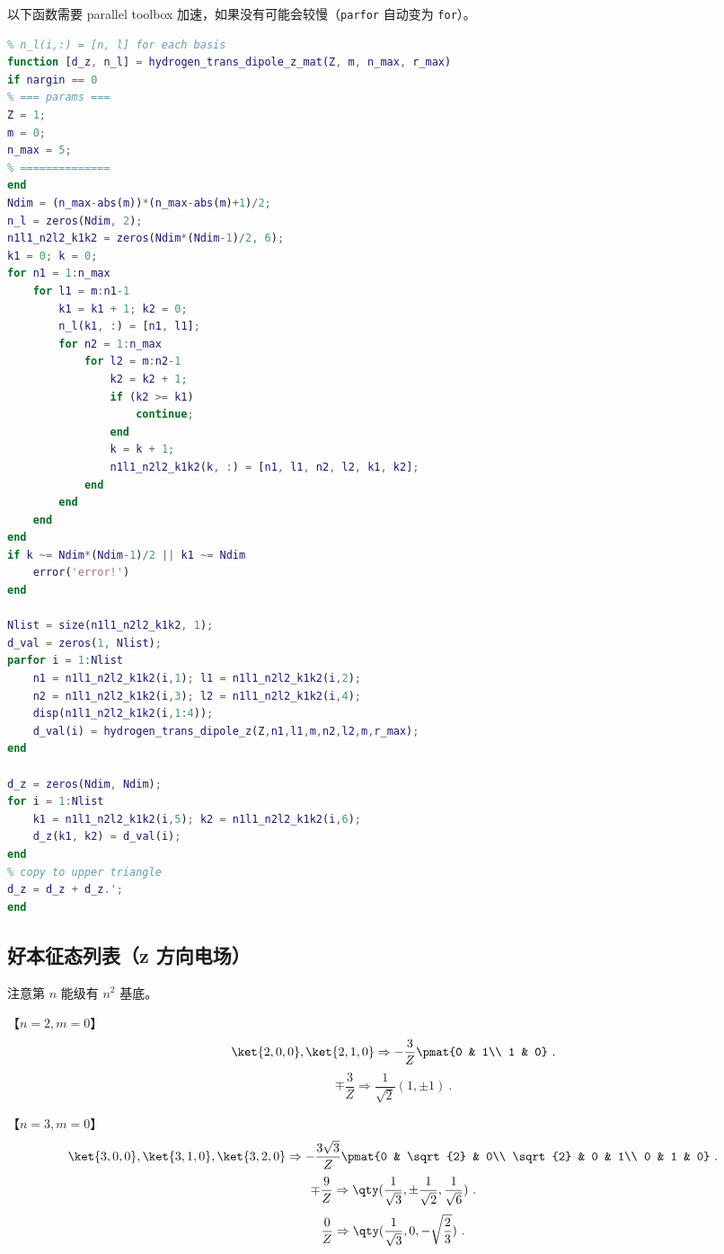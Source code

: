 以下函数需要 parallel toolbox 加速，如果没有可能会较慢（\verb`parfor` 自动变为 \verb`for`）。
\begin{lstlisting}[language=matlab,caption=hydrogen\_dipole\_z\_mat.m]
% hydrogen <n1,l1,m1|z|n2,l2,m2> matrix
% n_l(i,:) = [n, l] for each basis
function [d_z, n_l] = hydrogen_trans_dipole_z_mat(Z, m, n_max, r_max)
if nargin == 0
% === params ===
Z = 1;
m = 0;
n_max = 5;
% ==============
end
Ndim = (n_max-abs(m))*(n_max-abs(m)+1)/2;
n_l = zeros(Ndim, 2);
n1l1_n2l2_k1k2 = zeros(Ndim*(Ndim-1)/2, 6);
k1 = 0; k = 0;
for n1 = 1:n_max
    for l1 = m:n1-1
        k1 = k1 + 1; k2 = 0;
        n_l(k1, :) = [n1, l1];
        for n2 = 1:n_max
            for l2 = m:n2-1
                k2 = k2 + 1;
                if (k2 >= k1)
                    continue;
                end
                k = k + 1;
                n1l1_n2l2_k1k2(k, :) = [n1, l1, n2, l2, k1, k2];
            end
        end
    end
end
if k ~= Ndim*(Ndim-1)/2 || k1 ~= Ndim
    error('error!')
end

Nlist = size(n1l1_n2l2_k1k2, 1);
d_val = zeros(1, Nlist);
parfor i = 1:Nlist
    n1 = n1l1_n2l2_k1k2(i,1); l1 = n1l1_n2l2_k1k2(i,2);
    n2 = n1l1_n2l2_k1k2(i,3); l2 = n1l1_n2l2_k1k2(i,4);
    disp(n1l1_n2l2_k1k2(i,1:4));
    d_val(i) = hydrogen_trans_dipole_z(Z,n1,l1,m,n2,l2,m,r_max);
end

d_z = zeros(Ndim, Ndim);
for i = 1:Nlist
    k1 = n1l1_n2l2_k1k2(i,5); k2 = n1l1_n2l2_k1k2(i,6);
    d_z(k1, k2) = d_val(i);
end
% copy to upper triangle
d_z = d_z + d_z.';
end
\end{lstlisting}

\subsection{好本征态列表（z 方向电场）}\label{sub_HDipM_1}
注意第 $n$ 能级有 $n^2$ 基底。

【$n=2, m=0$】
\begin{equation}
\ket{2,0,0},\ket{2,1,0} \Rightarrow-\frac{3}{Z}\pmat{0 & 1\\ 1 & 0}~.
\end{equation}
\begin{equation}
\mp\frac{3}{Z} \Rightarrow \frac{1}{\sqrt{2}}(1, \pm1)~.
\end{equation}

【$n=3, m=0$】
\begin{equation}
\ket{3,0,0},\ket{3,1,0},\ket{3,2,0}\Rightarrow
-\frac{3\sqrt{3}}{Z}\pmat{0 & \sqrt{2} & 0\\ \sqrt{2} & 0 & 1\\ 0 & 1 & 0}~.
\end{equation}
\begin{equation}
\mp\frac{9}{Z} \Rightarrow \qty(\frac{1}{\sqrt{3}}, \pm \frac{1}{\sqrt{2}}, \frac{1}{\sqrt{6}})~.
\end{equation}
\begin{equation}
\frac{0}{Z} \Rightarrow \qty(\frac{1}{\sqrt{3}}, 0, -\sqrt{\frac{2}{3}})~.
\end{equation}

